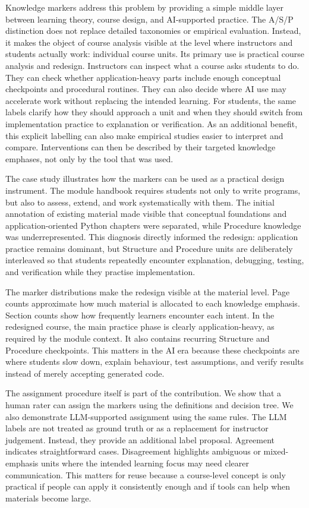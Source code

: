 \documentclass{article}
\begin{document}
Knowledge markers address this problem by providing a simple middle layer between learning theory, course design, and AI-supported practice. The A/S/P distinction does not replace detailed taxonomies or empirical evaluation. Instead, it makes the object of course analysis visible at the level where instructors and students actually work: individual course units. Its primary use is practical course analysis and redesign. Instructors can inspect what a course asks students to do. They can check whether application-heavy parts include enough conceptual checkpoints and procedural routines. They can also decide where AI use may accelerate work without replacing the intended learning. For students, the same labels clarify how they should approach a unit and when they should switch from implementation practice to explanation or verification. As an additional benefit, this explicit labelling can also make empirical studies easier to interpret and compare. Interventions can then be described by their targeted knowledge emphases, not only by the tool that was used.\par

The case study illustrates how the markers can be used as a practical design instrument. The module handbook requires students not only to write programs, but also to assess, extend, and work systematically with them. The initial annotation of existing material made visible that conceptual foundations and application-oriented Python chapters were separated, while Procedure knowledge was underrepresented. This diagnosis directly informed the redesign: application practice remains dominant, but Structure and Procedure units are deliberately interleaved so that students repeatedly encounter explanation, debugging, testing, and verification while they practise implementation.\par

The marker distributions make the redesign visible at the material level. Page counts approximate how much material is allocated to each knowledge emphasis. Section counts show how frequently learners encounter each intent. In the redesigned course, the main practice phase is clearly application-heavy, as required by the module context. It also contains recurring Structure and Procedure checkpoints. This matters in the AI era because these checkpoints are where students slow down, explain behaviour, test assumptions, and verify results instead of merely accepting generated code.\par

The assignment procedure itself is part of the contribution. We show that a human rater can assign the markers using the definitions and decision tree. We also demonstrate LLM-supported assignment using the same rules. The LLM labels are not treated as ground truth or as a replacement for instructor judgement. Instead, they provide an additional label proposal. Agreement indicates straightforward cases. Disagreement highlights ambiguous or mixed-emphasis units where the intended learning focus may need clearer communication. This matters for reuse because a course-level concept is only practical if people can apply it consistently enough and if tools can help when materials become large.\par
\end{document}
